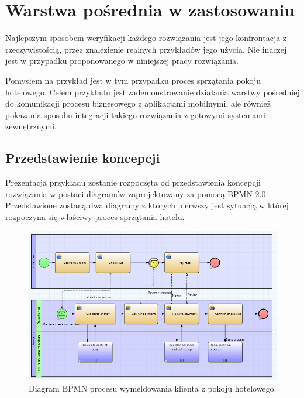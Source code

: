 \chapter{Warstwa pośrednia w zastosowaniu }
\label{cha:example}

Najlepszym sposobem weryfikacji każdego rozwiązania jest jego konfrontacja z rzeczywistością, przez znalezienie realnych przykładów jego użycia. Nie inaczej jest w przypadku proponowanego w niniejszej pracy rozwiązania. 

Pomysłem na przykład jest w tym przypadku proces sprzątania pokoju hotelowego. Celem przykładu jest zademonstrowanie działania warstwy pośredniej do komunikacji procesu biznesowego z aplikacjami mobilnymi, ale również pokazania sposobu integracji takiego rozwiązania z gotowymi systemami zewnętrznymi. 


\section{Przedstawienie koncepcji}
\label{sec:concept}

Prezentacja przykładu zostanie rozpoczęta od przedstawienia koncepcji rozwiązania w postaci diagramów zaprojektowany za pomocą BPMN 2.0. Przedstawione zostaną dwa diagramy z których pierwszy jest sytuacją w której rozpoczyna się właściwy proces sprzątania hotelu. 

\begin{figure}[h]
\centerline{\includegraphics[scale=0.4]{hotelCheckOutProcess}}
\caption{Diagram BPMN procesu wymeldowania klienta z pokoju hotelowego.}
\label{fig:hotelCheckOutProcess}
\end{figure}

